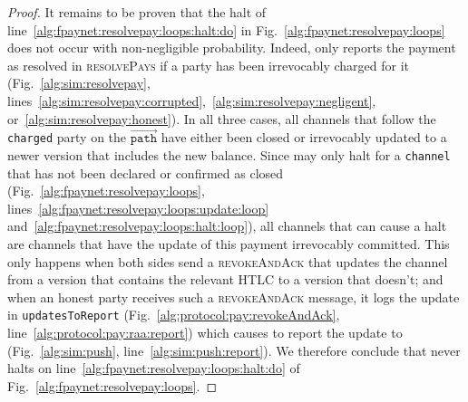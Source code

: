 \begin{proof}
  It remains to be proven that the halt of
  line~\ref{alg:fpaynet:resolvepay:loops:halt:do} in
  Fig.~\ref{alg:fpaynet:resolvepay:loops} does not occur with non-negligible
  probability. Indeed, \simulator{} only reports the payment as resolved in
  \textsc{resolvePays} if a party has been irrevocably charged for it
  (Fig.~\ref{alg:sim:resolvepay},
  lines~\ref{alg:sim:resolvepay:corrupted},~\ref{alg:sim:resolvepay:negligent},
  or~\ref{alg:sim:resolvepay:honest}). In all three cases, all channels that
  follow the \texttt{charged} party on the $\overrightarrow{\mathtt{path}}$ have
  either been closed or irrevocably updated to a newer version that includes the
  new balance. Since \fpaynet{} may only halt for a \texttt{channel} that has
  not been declared or confirmed as closed
  (Fig.~\ref{alg:fpaynet:resolvepay:loops},
  lines~\ref{alg:fpaynet:resolvepay:loops:update:loop}
  and~\ref{alg:fpaynet:resolvepay:loops:halt:loop}), all channels that can cause
  a halt are channels that have the update of this payment irrevocably
  committed. This only happens when both sides send a \textsc{revokeAndAck} that
  updates the channel from a version that contains the relevant HTLC to a
  version that doesn't; and when an honest party receives such a
  \textsc{revokeAndAck} message, it logs the update in \texttt{updatesToReport}
  (Fig.~\ref{alg:protocol:pay:revokeAndAck},
  line~\ref{alg:protocol:pay:raa:report}) which causes \simulator{} to report
  the update to \fpaynet{} (Fig.~\ref{alg:sim:push},
  line~\ref{alg:sim:push:report}). We therefore conclude that \fpaynet{} never
  halts on line~\ref{alg:fpaynet:resolvepay:loops:halt:do} of
  Fig.~\ref{alg:fpaynet:resolvepay:loops}.


\end{proof}
